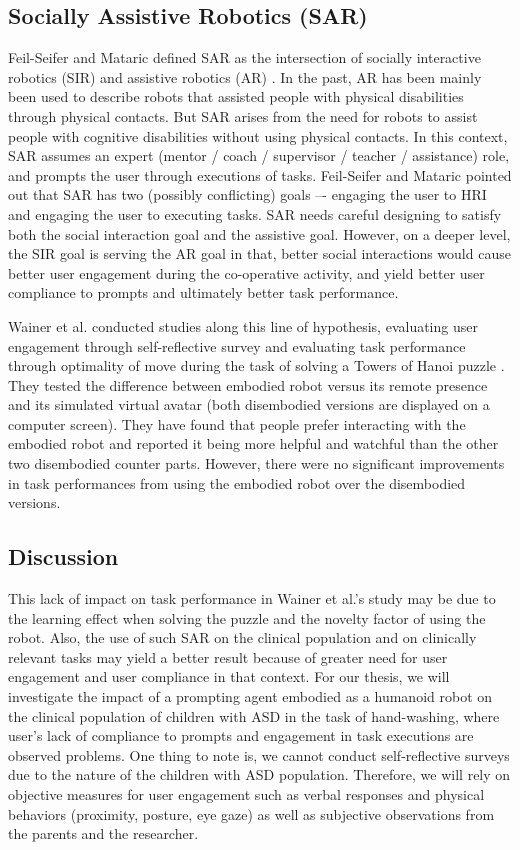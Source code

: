 \subsection{Socially Assistive Robotics (SAR)}
Feil-Seifer and Mataric defined SAR as the intersection of socially interactive robotics (SIR) and assistive robotics (AR) \cite{feil2005defining}.  In the past, AR has been mainly been used to describe robots that assisted people with physical disabilities through physical contacts.  But SAR arises from the need for robots to assist people with cognitive disabilities without using physical contacts.  In this context, SAR assumes an expert (mentor / coach / supervisor / teacher / assistance) role, and prompts the user through executions of tasks.  Feil-Seifer and Mataric pointed out that SAR has two (possibly conflicting) goals –- engaging the user to HRI and engaging the user to executing tasks.  SAR needs careful designing to satisfy both the social interaction goal and the assistive goal.  However, on a deeper level, the SIR goal is serving the AR goal in that, better social interactions would cause better user engagement during the co-operative activity, and yield better user compliance to prompts and ultimately better task performance.


Wainer et al. conducted studies along this line of hypothesis, evaluating user engagement through self-reflective survey and evaluating task performance through optimality of move during the task of solving a Towers of Hanoi puzzle \cite{wainer2007embodiment}.  They tested the difference between embodied robot versus its remote presence and its simulated virtual avatar (both disembodied versions are displayed on a computer screen).  They have found that people prefer interacting with the embodied robot and reported it being more helpful and watchful than the other two disembodied counter parts.  However, there were no significant improvements in task performances from using the embodied robot over the disembodied versions.


\subsection{Discussion}
This lack of impact on task performance in Wainer et al.'s study may be due to the learning effect when solving the puzzle and the novelty factor of using the robot.  Also, the use of such SAR on the clinical population and on clinically relevant tasks may yield a better result because of greater need for user engagement and user compliance in that context.  For our thesis, we will investigate the impact of a prompting agent embodied as a humanoid robot on the clinical population of children with ASD in the task of hand-washing, where user's lack of compliance to prompts and engagement in task executions are observed problems.  One thing to note is, we cannot conduct self-reflective surveys due to the nature of the children with ASD population.  Therefore, we will rely on objective measures for user engagement such as verbal responses and physical behaviors (proximity, posture, eye gaze) \cite{mataric2005role} as well as subjective observations from the parents and the researcher.


